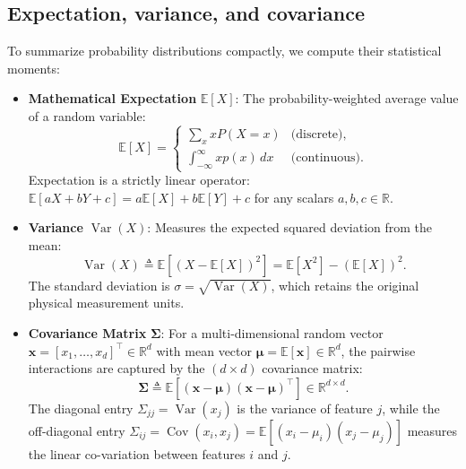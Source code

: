 \subsection{Expectation, variance, and covariance}
\label{sec:moments_and_covariance}

To summarize probability distributions compactly, we compute their statistical moments:
\begin{itemize}
  \item \textbf{Mathematical Expectation} $\mathbb{E}[X]$: The probability-weighted average value of a random variable:
  \begin{equation}
  \mathbb{E}[X] = \begin{cases} \sum_x x P(X = x) & \text{(discrete)}, \\ \int_{-\infty}^\infty x p(x) \, dx & \text{(continuous)}. \end{cases}
  \end{equation}
  Expectation is a strictly linear operator: $\mathbb{E}[a X + b Y + c] = a \mathbb{E}[X] + b \mathbb{E}[Y] + c$ for any scalars $a, b, c \in \mathbb{R}$.
  \item \textbf{Variance} $\operatorname{Var}(X)$: Measures the expected squared deviation from the mean:
  \begin{equation}
  \operatorname{Var}(X) \triangleq \mathbb{E}\left[ (X - \mathbb{E}[X])^2 \right] = \mathbb{E}[X^2] - (\mathbb{E}[X])^2.
  \end{equation}
  The standard deviation is $\sigma = \sqrt{\operatorname{Var}(X)}$, which retains the original physical measurement units.
  \item \textbf{Covariance Matrix} $\boldsymbol{\Sigma}$: For a multi-dimensional random vector $\mathbf{x} = [x_1, \dots, x_d]^\top \in \mathbb{R}^d$ with mean vector $\boldsymbol{\mu} = \mathbb{E}[\mathbf{x}] \in \mathbb{R}^d$, the pairwise interactions are captured by the $(d \times d)$ covariance matrix:
  \begin{equation}
  \boldsymbol{\Sigma} \triangleq \mathbb{E}\left[ (\mathbf{x} - \boldsymbol{\mu})(\mathbf{x} - \boldsymbol{\mu})^\top \right] \in \mathbb{R}^{d \times d}.
  \label{eq:covariance_matrix_definition}
  \end{equation}
  The diagonal entry $\Sigma_{jj} = \operatorname{Var}(x_j)$ is the variance of feature $j$, while the off-diagonal entry $\Sigma_{ij} = \operatorname{Cov}(x_i, x_j) = \mathbb{E}[(x_i - \mu_i)(x_j - \mu_j)]$ measures the linear co-variation between features $i$ and $j$.
\end{itemize}


